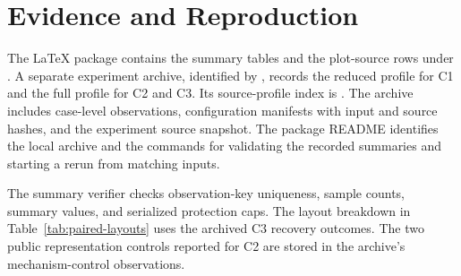 \documentclass[10pt,journal,onecolumn]{IEEEtran}
\begin{document}
\section{Evidence and Reproduction}
The LaTeX package contains the summary tables and the plot-source rows under
. A separate experiment archive, identified by
, records the reduced profile for C1 and the full
profile for C2 and C3. Its source-profile index is
. The archive includes case-level
observations, configuration manifests with input and source hashes, and the
experiment source snapshot. The package README identifies the local archive
and the commands for validating the recorded summaries and starting a rerun
from matching inputs.

The summary verifier checks observation-key uniqueness, sample counts,
summary values, and serialized protection caps. The layout breakdown in
Table~\ref{tab:paired-layouts} uses the archived C3 recovery outcomes.
The two public representation controls reported for C2 are stored in the
archive's mechanism-control observations.



\end{document}
